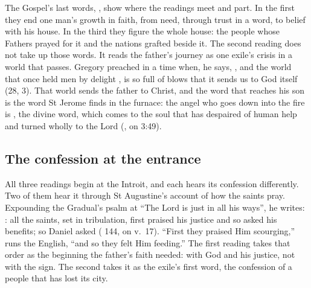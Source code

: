 The Gospel's last words, , show
where the readings meet and part. In the first they end one man's growth in
faith, from need, through trust in a word, to belief with his house. In the
third they figure the whole house: the people whose Fathers prayed for it and
the nations grafted beside it. The second reading does not take up those words.
It reads the father's journey as one exile's crisis in a world that passes.
Gregory preached in a time when, he says, , and the world that once held men by delight , is so full of blows
that it sends us to God itself (28, 3). That world sends the father to Christ, and the word that reaches his son is
the word St Jerome finds in the furnace: the angel who goes down into the fire
is , the divine word, which comes to the soul that has
despaired of human help and turned wholly to the Lord (, on 3:49).

\subsection{The confession at the entrance}

All three readings begin at the Introit, and each hears its confession
differently. Two of them hear it through St Augustine's account of how the
saints pray. Expounding the Gradual's psalm at ``The Lord is just in all his
ways'', he writes: : all the saints, set in tribulation, first
praised his justice and so asked his benefits; so Daniel asked
( 144, on v.~17). ``First they praised Him
scourging,'' runs the English, ``and so they felt Him feeding.'' The first
reading takes that order as the beginning the father's faith needed: with God
and his justice, not with the sign. The second takes it as the exile's first
word, the confession of a people that has lost its city.

